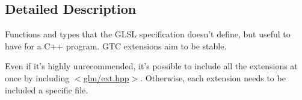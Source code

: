 \subsection{Detailed Description}
Functions and types that the G\-L\-S\-L specification doesn't define, but useful to have for a C++ program. G\-T\-C extensions aim to be stable.

Even if it's highly unrecommended, it's possible to include all the extensions at once by including $<$\hyperlink{ext_8hpp_source}{glm/ext.\-hpp}$>$. Otherwise, each extension needs to be included a specific file. 